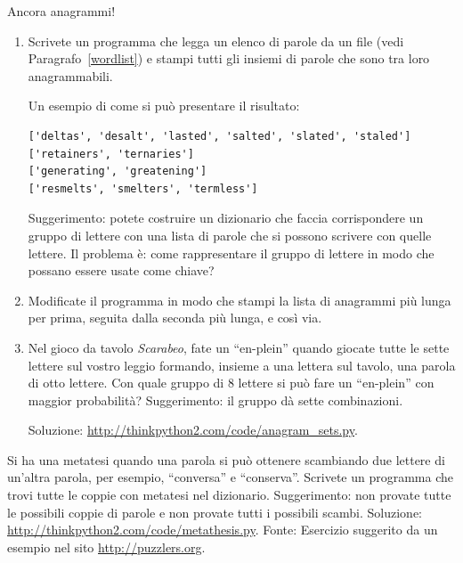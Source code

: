 \documentclass[10pt]{book}
\begin{document}
\vspace{0.2in}
\begin{exercise}
\label{anagrams}

Ancora anagrammi!

\begin{enumerate}

\item Scrivete un programma che legga un elenco di parole da un file (vedi Paragrafo~\ref{wordlist}) e stampi tutti gli insiemi di parole che sono tra loro anagrammabili.

Un esempio di come si può presentare il risultato:

\begin{verbatim}
['deltas', 'desalt', 'lasted', 'salted', 'slated', 'staled']
['retainers', 'ternaries']
['generating', 'greatening']
['resmelts', 'smelters', 'termless']
\end{verbatim}
%
Suggerimento: potete costruire un dizionario che faccia corrispondere un gruppo di lettere con una lista di parole che si possono scrivere con quelle lettere. Il problema è: come rappresentare il gruppo di lettere in modo che possano essere usate come chiave?

\item Modificate il programma in modo che stampi la lista di anagrammi più lunga per prima, seguita dalla seconda più lunga, e così via.

\item Nel gioco da tavolo {\em Scarabeo}, fate un ``en-plein'' quando giocate tutte le sette lettere sul vostro leggio formando, insieme a una lettera sul tavolo, una parola di otto lettere. Con quale gruppo di 8 lettere si può fare un ``en-plein'' con maggior probabilità?
Suggerimento: il gruppo dà sette combinazioni.


Soluzione: \url{http://thinkpython2.com/code/anagram_sets.py}.

\end{enumerate}
\end{exercise}

\vspace{0.2in}
\begin{exercise}

Si ha una metatesi quando una parola si può ottenere scambiando due lettere di un'altra parola, per esempio, ``conversa'' e ``conserva''.  Scrivete un programma che trovi tutte le coppie con metatesi nel dizionario. Suggerimento: non provate tutte le possibili coppie di parole e non provate tutti i possibili scambi. Soluzione: \url{http://thinkpython2.com/code/metathesis.py}.
Fonte: Esercizio suggerito da un esempio nel sito \url{http://puzzlers.org}.

\end{exercise}
\end{document}
